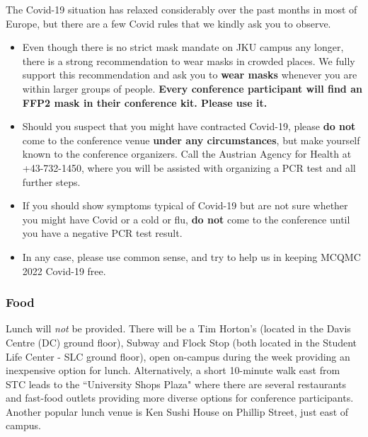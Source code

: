 The Covid-19 situation has relaxed considerably over the past months in most of Europe, but there are a few Covid rules that 
we kindly ask you to observe.
\begin{itemize}
 \item Even though there is no strict mask mandate on JKU campus any longer, there is a strong recommendation to wear masks in crowded places. We 
 fully support this recommendation and ask you to \textbf{wear masks} whenever you are within larger groups of people. 
 \textbf{Every conference participant will find an FFP2 mask in their conference kit. Please use it.}
 \item Should you suspect that you might have contracted Covid-19, please \textbf{do not} come to the conference 
 venue \textbf{under any circumstances}, but make yourself known to the conference organizers. Call the Austrian Agency for Health at +43-732-1450, where you 
 will be assisted with organizing a PCR test and all further steps.
 \item If you should show symptoms typical of Covid-19 but are not sure 
 whether you might have Covid or a cold or flu, \textbf{do not} come to the conference until you have a negative PCR test result. 
 \item In any case, please use common sense, and try to help us in keeping MCQMC 2022 Covid-19 free. 

 
\end{itemize}
\fi



\subsubsection{Food}

Lunch will \emph{not} be provided. There will be a Tim Horton's (located in the Davis Centre (DC) ground floor), Subway and Flock Stop (both located in the Student Life Center - SLC ground floor), open on-campus during the week providing an inexpensive option for lunch.  
Alternatively, a short 10-minute walk east from STC leads to the ``University Shops Plaza" where there are several restaurants and fast-food outlets providing more diverse options for conference participants. Another popular lunch venue is Ken Sushi House on Phillip Street, just east of campus.

\iffalse
{}

